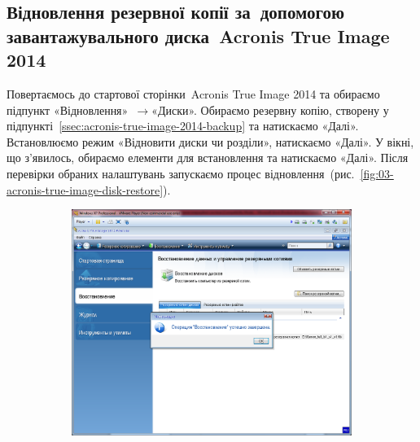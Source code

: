 \documentclass[
	a4paper,
	oneside,
	DIV = 12,
	fontsize = 13pt,
	headings = normal,
]{scrartcl}
\newcommand{\Mytextrightarrow}{$\rightarrow$\hspace{0.25em}}
\begin{document}
		\subsection{Відновлення резервної копії за~допомогою завантажувального диска~\textenglish{Acronis True Image 2014}}
			Повертаємось до стартової сторінки~\textenglish{Acronis True Image 2014} та обираємо підпункт «Відновлення»~\Mytextrightarrow «Диски». Обираємо резервну копію, створену у підпункті~\ref{ssec:acronis-true-image-2014-backup} та натискаємо «Далі». Встановлюємо режим «Відновити диски чи розділи», натискаємо «Далі». У вікні, що з'явилось, обираємо елементи для встановлення та натискаємо «Далі». Після перевірки обраних налаштувань запускаємо процес відновлення~(рис.~\ref{fig:03-acronis-true-image-disk-restore}).

			\begin{figure}[!htbp]
				\centering
				\begin{subfigure}{0.5\columnwidth}
					\centering
					\includegraphics[height = 8\baselineskip]{./assets/y03s01-pcdiag-lab-04-p05.png}
					\caption{}
					\label{subfig:03-01-acronis-true-image-disk-restore-inprocess}
				\end{subfigure}%
				\begin{subfigure}{0.5\columnwidth}
					\centering

\end{subfigure}
\end{figure}
\end{document}
